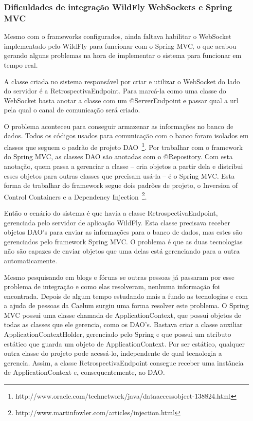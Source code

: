 \subsubsection*{Dificuldades de integração WildFly WebSockets e Spring MVC}

Mesmo com o frameworks configurados, ainda faltava habilitar o WebSocket implementado pelo WildFly para funcionar com o Spring MVC, o que acabou gerando alguns problemas na hora de implementar o sistema para funcionar em tempo real.

A classe criada no sistema responsável por criar e utilizar o WebSocket do lado do servidor é a RetrospectivaEndpoint. Para marcá-la como uma classe do WebSocket basta anotar a classe com um @ServerEndpoint e passar qual a url pela qual o canal de comunicação será criado.

O problema aconteceu para conseguir armazenar as informações no banco de dados. Todos os códigos usados para comunicação com o banco foram isolados em classes que seguem o padrão de projeto DAO~\footnote{http://www.oracle.com/technetwork/java/dataaccessobject-138824.html}. Por trabalhar com o framework do Spring MVC, as classes DAO são anotadas com o @Repository. Com esta anotação, quem passa a gerenciar a classe -- cria objetos a partir dela e distribui esses objetos para outras classes que precisam usá-la -- é o Spring MVC. Esta forma de trabalhar do framework segue dois padrões de projeto, o Inversion of Control Containers e a Dependency Injection~\footnote{http://www.martinfowler.com/articles/injection.html}.

Então o cenário do sistema é que havia a classe RetrospectivaEndpoint, gerenciada pelo servidor de aplicação WildFly. Esta classe precisava receber objetos DAO's para enviar as informações para o banco de dados, mas estes são gerenciados pelo framework Spring MVC. O problema é que as duas tecnologias não são capazes de enviar objetos que uma delas está gerenciando para a outra automaticamente.

Mesmo pesquisando em blogs e fóruns se outras pessoas já passaram por esse problema de integração e como elas resolveram, nenhuma informação foi encontrada. Depois de algum tempo estudando mais a fundo as tecnologias e com a ajuda de pessoas da Caelum surgiu uma forma resolver este problema. O Spring MVC possui uma classe chamada de ApplicationContext, que possui objetos de todas as classes que ele gerencia, como os DAO's. Bastava criar a classe auxiliar ApplicationContextHolder, gerenciado pelo Spring e que possui um atributo estático que guarda um objeto de ApplicationContext. Por ser estático, qualquer outra classe do projeto pode acessá-lo, independente de qual tecnologia a gerencia. Assim, a classe RetrospectivaEndpoint consegue receber uma instância de ApplicationContext e, consequentemente, ao DAO.

